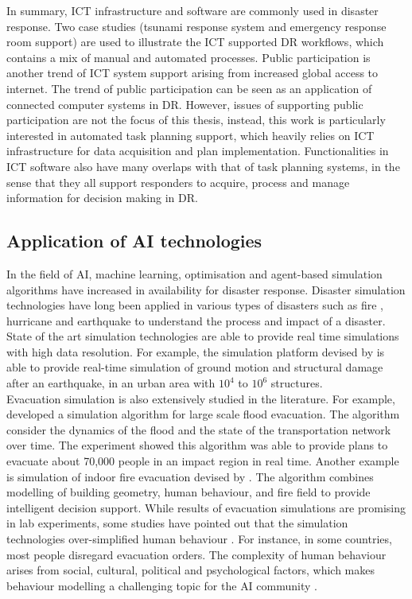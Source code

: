 In summary, \ac{ICT} infrastructure and software are commonly used in disaster response. Two case studies (tsunami response system and emergency response room support) are used to illustrate the \ac{ICT} supported \ac{DR} workflows, which contains a mix of manual and automated processes. Public participation is another trend of \ac{ICT} system support arising from increased global access to internet. The trend of public participation can be seen as an application of connected computer systems in \ac{DR}. However, issues of supporting public participation are not the focus of this thesis, instead, this work is particularly interested in automated task planning support, which heavily relies on \ac{ICT} infrastructure for data acquisition and plan implementation. Functionalities in \ac{ICT} software also have many overlaps with that of task planning systems, in the sense that they all support responders to acquire, process and manage information for decision making in \ac{DR}. \\


\subsection{Application of AI technologies}\label{sec:lraisupport}
In the field of \ac{AI}, machine learning, optimisation and agent-based simulation algorithms have increased in availability for disaster response. Disaster simulation technologies \citep{Okaya,Scerri2005} have long been applied in various types of disasters such as fire \citep{Tang2012}, hurricane \citep{Vickery2009} and earthquake \citep{Sobhaninejad2011} to understand the process and impact of a disaster. State of the art simulation technologies are able to provide real time simulations with high data resolution. For example, the simulation platform devised by \citep{Sobhaninejad2011} is able to provide real-time simulation of ground motion and structural damage after an earthquake, in an urban area with $10^{4}$ to $10^{6}$ structures. \\

Evacuation simulation is also extensively studied in the literature. For example, \cite{Pillac2015} developed a simulation algorithm for large scale flood evacuation. The algorithm consider the dynamics of the flood and the state of the transportation network over time. The experiment showed this algorithm was able to provide plans to evacuate about 70,000 people in an impact region in real time.  Another example is simulation of indoor fire evacuation devised by \cite{Tang2012}.  The algorithm combines modelling of building geometry, human behaviour, and fire field to provide intelligent decision support. While results of evacuation simulations are promising in lab experiments, some studies have pointed out that the simulation technologies over-simplified human behaviour \citep{Hentenryck2011}. For instance, in some countries, most people disregard evacuation orders. The complexity of human behaviour arises from social, cultural, political and psychological factors, which makes behaviour modelling a challenging topic for the \ac{AI} community \citep{Provitolo2011} . \\

